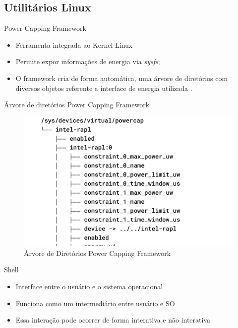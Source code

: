 \subsection{Utilitários Linux}
\begin{frame}{Power Capping Framework}
    \begin{itemize}
        \item Ferramenta integrada ao Kernel Linux
        \item Permite expor informações de energia via \emph{sysfs};
        \item O framework cria de forma automática, uma árvore de diretórios com
        diversos objetos referente a interface de energia utilizada \cite{kernel_org}.
    \end{itemize}
\end{frame}

\begin{frame}{Árvore de diretórios Power Capping Framework}
    \begin{figure}
        \centering
        \includegraphics[width=0.65\linewidth]{images/powercap-tree.png}
        \caption{Árvore de Diretórios Power Capping Framework}
        \label{fig:powercap-tree}
    \end{figure}
\end{frame}

\begin{frame}{Shell}
    \begin{itemize}
        \item Interface entre o usuário e o sistema operacional
        \item Funciona como um intermediário entre usuário e SO
        \item Essa interação pode ocorrer de forma interativa e não interativa
    \end{itemize}
\end{frame}

